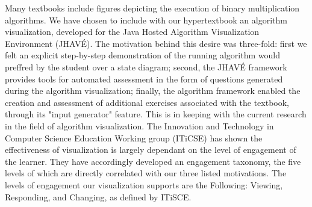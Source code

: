 \documentclass{acm_proc_article-sp}
\begin{document}
Many textbooks include figures depicting the execution of binary multiplication algorithms.  We have chosen to include with our hypertextbook an algorithm visualization, developed for the Java Hosted Algorithm Visualization Environment (JHAVÉ). The motivation behind this desire was three-fold: first we felt an explicit step-by-step demonstration of the running algorithm would preffred by the student over a state diagram; second, the JHAVÉ framework provides tools for automated assessment in the form of questions generated during the algorithm visualization; finally, the algorithm framework enabled the creation and assessment of additional exercises associated with the textbook, through its "input generator" feature.  This is in keeping with the current research in the field of algorithm visualization\cite{needsCitation}.  The Innovation and Technology in Computer Science Education Working group (ITiCSE) has shown the effectiveness of visualization is largely dependant on the level of engagement of the learner\cite{needsCitation}.  They have accordingly developed an engagement taxonomy, the five levels of which are directly correlated with our three listed motivations.  The levels of engagement our visualization supports are the Following: Viewing, Responding, and Changing, as defined by ITiSCE.

\balancecolumns
\end{document}
